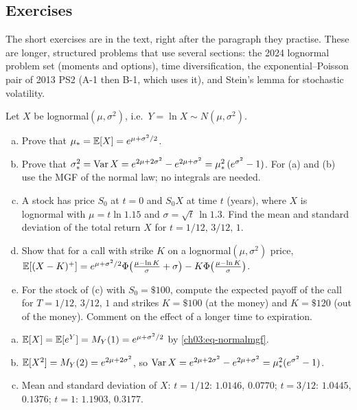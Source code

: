 \begin{paracol}{2}
\section*{Exercises}
\label{ch03:sec-exercises}
The short exercises are in the text, right after the paragraph they practise. These are longer, structured
problems that use several sections: the 2024 lognormal problem set (moments and options), time
diversification, the exponential--Poisson pair of 2013 PS2 (A-1 then B-1, which uses it), and Stein's lemma
for stochastic volatility.

\begin{exercise}\label{ch03:ex-ps2}
Let $X$ be lognormal$(\mu,\sigma^2)$, i.e.\ $Y=\ln X\sim N(\mu,\sigma^2)$.
\begin{enumerate}[(a)]
  \item Prove that $\mu_*=\mathbb{E}[X]=e^{\mu+\sigma^2/2}$.
  \item Prove that $\sigma_*^2=\operatorname{Var} X=e^{2\mu+2\sigma^2}-e^{2\mu+\sigma^2}=\mu_*^2\,(e^{\sigma^2}-1)$.
      For (a) and (b) use the MGF of the normal law; no integrals are needed.
  \item A stock has price $S_0$ at $t=0$ and $S_0X$ at time $t$ (years), where $X$ is lognormal with $\mu=t\ln1.15$
      and $\sigma=\sqrt t\,\ln1.3$. Find the mean and standard deviation of the total return $X$ for $t=1/12,\,3/12,\,1$.
  \item Show that for a call with strike $K$ on a lognormal$(\mu,\sigma^2)$ price,
      $\mathbb{E}[(X-K)^+]=e^{\mu+\sigma^2/2}\Phi\bigl(\frac{\mu-\ln K}{\sigma}+\sigma\bigr)-K\Phi\bigl(\frac{\mu-\ln K}{\sigma}\bigr)$.
  \item For the stock of (c) with $S_0=\$100$, compute the expected payoff of the call for $T=1/12,\,3/12,\,1$ and
      strikes $K=\$100$ (at the money) and $K=\$120$ (out of the money). Comment on the effect of a longer time to
      expiration.
\end{enumerate}
\end{exercise}
\begin{solution}[ch03:ex-ps2]
\begin{enumerate}[(a)]
  \item $\mathbb{E}[X]=\mathbb{E}[e^Y]=M_Y(1)=e^{\mu+\sigma^2/2}$ by \eqref{ch03:eq-normalmgf}.
  \item $\mathbb{E}[X^2]=M_Y(2)=e^{2\mu+2\sigma^2}$, so $\operatorname{Var} X=e^{2\mu+2\sigma^2}-e^{2\mu+\sigma^2}=\mu_*^2(e^{\sigma^2}-1)$.
  \item Mean and standard deviation of $X$: $t=1/12$: $1.0146$, $0.0770$; $t=3/12$: $1.0445$, $0.1376$; $t=1$: $1.1903$, $0.3177$.

\end{enumerate}
\end{solution}
\end{paracol}
